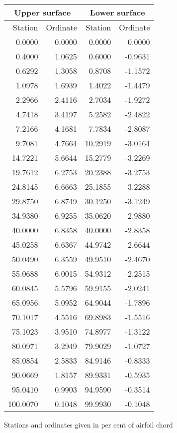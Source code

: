 \documentclass[11pt]{book}
\begin{document}
 \hspace{4mm}
 \begin{tabular}{|r|r|r|r|} \hline 
 \multicolumn{2}{|c|}{Upper surface} & \multicolumn{2}{|c|}{Lower surface} \\
 \hline
 Station & Ordinate & Station & Ordinate \\
 \hline
0.0000 & 0.0000 & 0.0000 & 0.0000 \\
0.4000 & 1.0625 & 0.6000 & -0.9631 \\
0.6292 & 1.3058 & 0.8708 & -1.1572 \\
1.0978 & 1.6939 & 1.4022 & -1.4479 \\
2.2966 & 2.4116 & 2.7034 & -1.9272 \\
4.7418 & 3.4197 & 5.2582 & -2.4822 \\
7.2166 & 4.1681 & 7.7834 & -2.8087 \\
9.7081 & 4.7664 & 10.2919 & -3.0164 \\
14.7221 & 5.6644 & 15.2779 & -3.2269 \\
19.7612 & 6.2753 & 20.2388 & -3.2753 \\
24.8145 & 6.6663 & 25.1855 & -3.2288 \\
29.8750 & 6.8749 & 30.1250 & -3.1249 \\
34.9380 & 6.9255 & 35.0620 & -2.9880 \\
40.0000 & 6.8358 & 40.0000 & -2.8358 \\
45.0258 & 6.6367 & 44.9742 & -2.6644 \\
50.0490 & 6.3559 & 49.9510 & -2.4670 \\
55.0688 & 6.0015 & 54.9312 & -2.2515 \\
60.0845 & 5.5796 & 59.9155 & -2.0241 \\
65.0956 & 5.0952 & 64.9044 & -1.7896 \\
70.1017 & 4.5516 & 69.8983 & -1.5516 \\
75.1023 & 3.9510 & 74.8977 & -1.3122 \\
80.0971 & 3.2949 & 79.9029 & -1.0727 \\
85.0854 & 2.5833 & 84.9146 & -0.8333 \\
90.0669 & 1.8157 & 89.9331 & -0.5935 \\
95.0410 & 0.9903 & 94.9590 & -0.3514 \\
100.0070 & 0.1048 & 99.9930 & -0.1048 \\
 \hline 
 \end{tabular}
 \vspace{8mm}

Stations and ordinates given in per cent of airfoil chord
\end{document}
